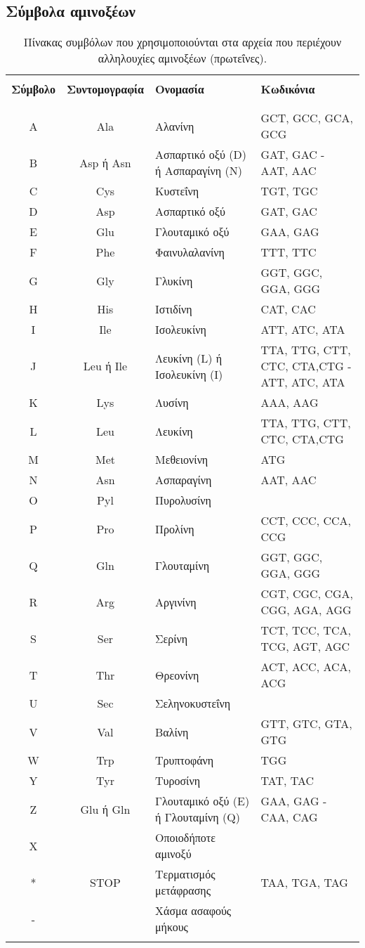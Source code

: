 \begin{refsection}
\section{Σύμβολα αμινοξέων}\label{aminoacid_symbols}
\begin{table}[ht] \centering \small
\caption[Πίνακας συμβόλων αμινοξέων]{Πίνακας συμβόλων που χρησιμοποιούνται στα αρχεία που περιέχουν αλληλουχίες αμινοξέων (πρωτεΐνες).}
\vspace{2mm}
\begin{tabular}  {c c l  p{6cm}}
 \hline
	&	&&\\
\textbf{Σύμβολο}	&\textbf{Συντομογραφία}	&\textbf{Ονομασία}&\textbf{Κωδικόνια}\\
	&	&&\\
\hline
	&	&&\\
A	&Ala	&Aλανίνη&GCT, GCC, GCA, GCG\\
B	&Asp ή Asn	&Aσπαρτικό οξύ (D) ή Aσπαραγίνη (N)& GAT, GAC - AAT, AAC\\
C	&Cys	&Κυστεΐνη&TGT, TGC\\
D	&Asp	&Aσπαρτικό οξύ&GAT, GAC\\
E	&Glu	&Γλουταμικό οξύ&GAA, GAG\\
F	&Phe	&Φαινυλαλανίνη&TTT, TTC\\
G	&Gly	&Γλυκίνη&GGT, GGC, GGA, GGG\\
H	&His	&Ιστιδίνη&CAT, CAC\\
I	&Ile	&Ισολευκίνη&ATT, ATC, ATA\\
J	&Leu ή Ile	&Λευκίνη (L) ή Iσολευκίνη (I)&TTA, TTG, CTT, CTC, CTA,CTG - ATT, ATC, ATA\\
K	&Lys	&Λυσίνη&AAA, AAG\\
L	&Leu	&Λευκίνη&TTA, TTG, CTT, CTC, CTA,CTG\\
M	&Met	&Mεθειονίνη&ATG\\
N	&Asn	&Aσπαραγίνη&AAT, AAC\\
O	&Pyl	&Πυρολυσίνη&\\
P	&Pro	&Προλίνη&CCT, CCC, CCA, CCG\\
Q	&Gln	&Γλουταμίνη&GGT, GGC, GGA, GGG\\
R	&Arg	&Aργινίνη&CGT, CGC, CGA, CGG, AGA, AGG\\
S	&Ser	&Σερίνη&TCT, TCC, TCA, TCG, AGT, AGC\\
T	&Thr	&Θρεονίνη&ACT, ACC, ACA, ACG\\
U	&Sec	&Σεληνοκυστεΐνη&\\
V	&Val	&Βαλίνη&GTT, GTC, GTA, GTG\\
W	&Trp	&Tρυπτοφάνη&TGG\\
Y	&Tyr	&Tυροσίνη&TAT, TAC\\
Z	&Glu ή Gln	&Γλουταμικό οξύ (E) ή Γλουταμίνη (Q)&GAA, GAG - CAA, CAG\\
X	&	&Οποιοδήποτε αμινοξύ&\\
*	&STOP	&Τερματισμός μετάφρασης&TAA, TGA, TAG\\
-	&	&Χάσμα ασαφούς μήκους&\\
	&	&&\\
\hline
\end{tabular}
\label{table:table_2_3}
\end{table} 
\end{refsection}
